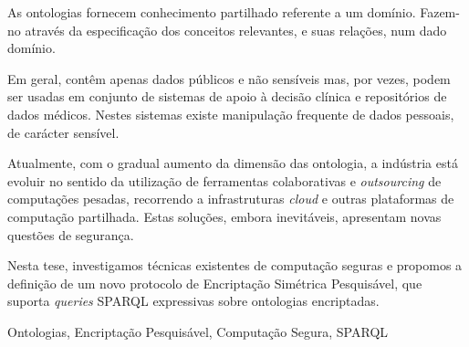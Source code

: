 %

As ontologias fornecem conhecimento partilhado referente a um domínio. Fazem-no através da especificação dos conceitos relevantes, e suas relações, num dado domínio.

Em geral, contêm apenas dados públicos e não sensíveis mas, por vezes, podem ser usadas em conjunto de sistemas de apoio à decisão clínica e repositórios de dados médicos. Nestes sistemas existe manipulação frequente de dados pessoais, de carácter sensível.

Atualmente, com o gradual aumento da dimensão das ontologia, a indústria está evoluir no sentido da utilização de ferramentas colaborativas e \emph{outsourcing} de computações pesadas, recorrendo a infrastruturas \emph{cloud} e outras plataformas de computação partilhada. Estas soluções, embora inevitáveis, apresentam novas questões de segurança.

Nesta tese, investigamos técnicas existentes de computação seguras e propomos a definição de um novo protocolo de Encriptação Simétrica Pesquisável, que suporta \emph{queries} SPARQL expressivas sobre ontologias encriptadas.

\begin{keywords}
Ontologias, Encriptação Pesquisável, Computação Segura, SPARQL
\end{keywords} 



